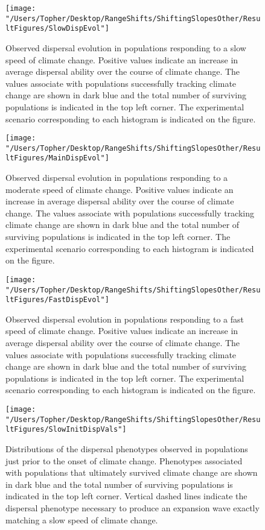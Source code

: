 \documentclass[11pt]{article}
\begin{document}
\begin{figure}[h!]
\texttt{[image: "/Users/Topher/Desktop/RangeShifts/ShiftingSlopesOther/ResultFigures/SlowDispEvol"]}
\caption{Observed dispersal evolution in populations responding to a slow speed of climate change. Positive values indicate an increase in average dispersal ability over the course of climate change. The values associate with populations successfully tracking climate change are shown in dark blue and the total number of surviving populations is indicated in the top left corner. The experimental scenario corresponding to each histogram is indicated on the figure.}
\label{Fig:DispEvolSlow}
\end{figure}

\clearpage

\begin{figure}[h!]
\texttt{[image: "/Users/Topher/Desktop/RangeShifts/ShiftingSlopesOther/ResultFigures/MainDispEvol"]}
\caption{Observed dispersal evolution in populations responding to a moderate speed of climate change. Positive values indicate an increase in average dispersal ability over the course of climate change. The values associate with populations successfully tracking climate change are shown in dark blue and the total number of surviving populations is indicated in the top left corner. The experimental scenario corresponding to each histogram is indicated on the figure.}
\label{Fig:DispEvolMain}
\end{figure}

\clearpage

\begin{figure}[h!]
\texttt{[image: "/Users/Topher/Desktop/RangeShifts/ShiftingSlopesOther/ResultFigures/FastDispEvol"]}
\caption{Observed dispersal evolution in populations responding to a fast speed of climate change. Positive values indicate an increase in average dispersal ability over the course of climate change. The values associate with populations successfully tracking climate change are shown in dark blue and the total number of surviving populations is indicated in the top left corner. The experimental scenario corresponding to each histogram is indicated on the figure.}
\label{Fig:DispEvolFast}
\end{figure}

\clearpage

\begin{figure}[h!]
\texttt{[image: "/Users/Topher/Desktop/RangeShifts/ShiftingSlopesOther/ResultFigures/SlowInitDispVals"]}
\caption{Distributions of the dispersal phenotypes observed in populations just prior to the onset of climate change. Phenotypes associated with populations that ultimately survived climate change are shown in dark blue and the total number of surviving populations is indicated in the top left corner. Vertical dashed lines indicate the dispersal phenotype necessary to produce an expansion wave exactly matching a slow speed of climate change.}
\label{Fig:InitDispSlow}
\end{figure}
\end{document}
